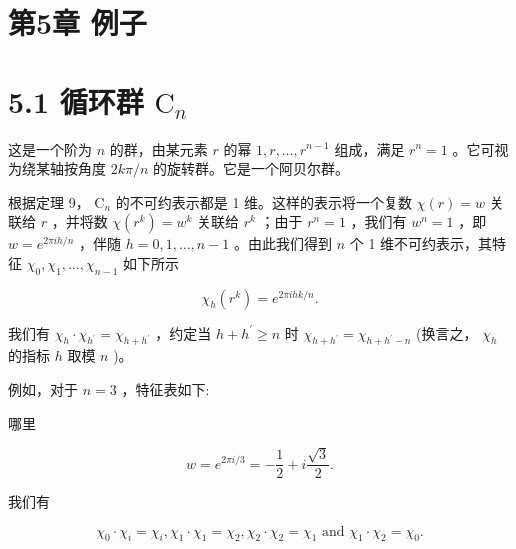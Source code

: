 \documentclass[10pt]{article}
\begin{document}
\section*{第5章 例子}

\section*{5.1 循环群 \({\mathrm{C}}_{n}\)}

这是一个阶为 \(n\) 的群，由某元素 \(r\) 的幂 \(1,r,\ldots ,{r}^{n - 1}\) 组成，满足 \({r}^{n} = 1\) 。它可视为绕某轴按角度 \({2k\pi }/n\) 的旋转群。它是一个阿贝尔群。

根据定理 9， \({\mathrm{C}}_{n}\) 的不可约表示都是 1 维。这样的表示将一个复数 \(\chi \left( r\right)  = w\) 关联给 \(r\) ，并将数 \(\chi \left( {r}^{k}\right)  = {w}^{k}\) 关联给 \({r}^{k}\) ；由于 \({r}^{n} = 1\) ，我们有 \({w}^{n} = 1\) ，即 \(w = {e}^{{2\pi ih}/n}\) ，伴随 \(h = 0,1,\ldots ,n - 1\) 。由此我们得到 \(n\) 个 1 维不可约表示，其特征 \({\chi }_{0},{\chi }_{1},\ldots ,{\chi }_{n - 1}\) 如下所示

\[
{\chi }_{h}\left( {r}^{k}\right)  = {e}^{{2\pi ihk}/n}.
\]

我们有 \({\chi }_{h} \cdot  {\chi }_{{h}^{\prime }} = {\chi }_{h + {h}^{\prime }}\) ，约定当 \(h + {h}^{\prime } \geq  n\) 时 \({\chi }_{h + {h}^{\prime }} = {\chi }_{h + {h}^{\prime } - n}\) (换言之， \({\chi }_{h}\) 的指标 \(h\) 取模 \(n\) )。

例如，对于 \(n = 3\) ，特征表如下:

\begin{center}
\end{center}

哪里

\[
w = {e}^{{2\pi i}/3} =  - \frac{1}{2} + i\frac{\sqrt{3}}{2}.
\]

我们有

\[
{\chi }_{0} \cdot  {\chi }_{i} = {\chi }_{i},{\chi }_{1} \cdot  {\chi }_{1} = {\chi }_{2},{\chi }_{2} \cdot  {\chi }_{2} = {\chi }_{1}\text{ and }{\chi }_{1} \cdot  {\chi }_{2} = {\chi }_{0}.
\]
\end{document}
